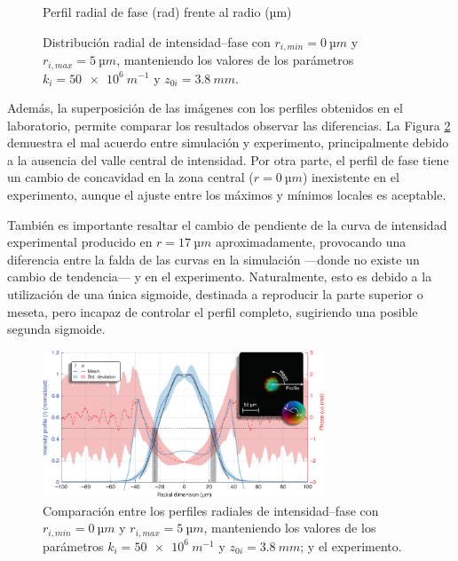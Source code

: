 \begin{figure}[htbp]
\begin{subcaptionblock}{.4\textwidth}
    \caption{Perfil radial de fase (\unit{rad}) frente al radio (\unit{µm})}\label{fig:ch4_fs01}
  \end{subcaptionblock}
   \caption{Distribución radial de intensidad--fase con $r_{i,min}=\qty{0}{µm}$ y $r_{i,max}=\qty{5}{µm}$, manteniendo los valores de los parámetros $k_{i}=\qty{50e6}{m^{-1}}$ y $z_{0i}=\qty{3.8}{mm}$.}
   \label{fig:4.6}
\end{figure}

Además, la superposición de las imágenes con los perfiles obtenidos en el laboratorio, permite comparar los resultados observar las diferencias. La Figura \ref{fig:4.7} demuestra el mal acuerdo entre simulación y experimento, principalmente debido a la ausencia del valle central de intensidad. Por otra parte, el perfil de fase tiene un cambio de concavidad en la zona central ($r=\qty{0}{µm}$) inexistente en el experimento, aunque el ajuste entre los máximos y mínimos locales es aceptable.

También es importante resaltar el cambio de pendiente de la curva de intensidad experimental producido en $r=\qty{17}{µm}$ aproximadamente, provocando una diferencia entre la falda de las curvas en la simulación ---donde no existe un cambio de tendencia--- y en el experimento. Naturalmente, esto es debido a la utilización de una única sigmoide, destinada a reproducir la parte superior o meseta, pero incapaz de controlar el perfil completo, sugiriendo una posible segunda sigmoide.

\begin{figure}[htbp]
  \centering
  \includegraphics[width=0.75\textwidth]{Figuras/ch4_cmp01.png}
  \caption{Comparación entre los perfiles radiales de intensidad--fase con $r_{i,min}=\qty{0}{µm}$ y $r_{i,max}=\qty{5}{µm}$, manteniendo los valores de los parámetros $k_{i}=\qty{50e6}{m^{-1}}$ y $z_{0i}=\qty{3.8}{mm}$; y el experimento.}
  \label{fig:4.7}
\end{figure}

